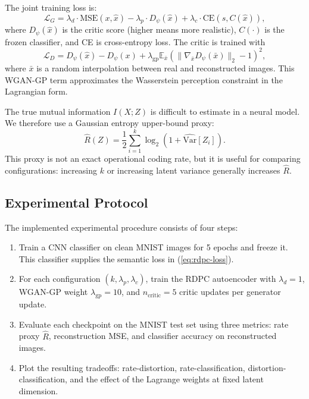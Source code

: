 \documentclass[conference]{IEEEtran}
\begin{document}
The joint training loss is:
\begin{equation}
\mathcal{L}_{G} = \lambda_d \cdot \text{MSE}(x, \hat{x})
 - \lambda_p \cdot D_\psi(\hat{x})
 + \lambda_c \cdot \text{CE}(s, C(\hat{x})),
\label{eq:rdpc-loss}
\end{equation}
where $D_\psi(\hat{x})$ is the critic score (higher means more realistic), $C(\cdot)$ is the frozen classifier, and CE is cross-entropy loss. The critic is trained with
\begin{equation}
\mathcal{L}_{D}=D_\psi(\hat{x})-D_\psi(x)
 +\lambda_{\mathrm{gp}}\mathbb{E}_{\bar{x}}
 \left(\|\nabla_{\bar{x}}D_\psi(\bar{x})\|_2-1\right)^2,
\end{equation}
where $\bar{x}$ is a random interpolation between real and reconstructed images. This WGAN-GP term approximates the Wasserstein perception constraint in the Lagrangian form.

The true mutual information $I(X;Z)$ is difficult to estimate in a neural model. We therefore use a Gaussian entropy upper-bound proxy:
\begin{equation}
\hat{R}(Z)=\frac{1}{2}\sum_{i=1}^{k}\log_2(1+\widehat{\mathrm{Var}}[Z_i]).
\label{eq:rate-proxy}
\end{equation}
This proxy is not an exact operational coding rate, but it is useful for comparing configurations: increasing $k$ or increasing latent variance generally increases $\hat{R}$.

\subsection{Experimental Protocol}

The implemented experimental procedure consists of four steps:
\begin{enumerate}
    \item Train a CNN classifier on clean MNIST images for 5 epochs and freeze it. This classifier supplies the semantic loss in (\ref{eq:rdpc-loss}).
    \item For each configuration $(k,\lambda_p,\lambda_c)$, train the RDPC autoencoder with $\lambda_d=1$, WGAN-GP weight $\lambda_{\mathrm{gp}}=10$, and $n_{\mathrm{critic}}=5$ critic updates per generator update.
    \item Evaluate each checkpoint on the MNIST test set using three metrics: rate proxy $\hat{R}$, reconstruction MSE, and classifier accuracy on reconstructed images.
    \item Plot the resulting tradeoffs: rate-distortion, rate-classification, distortion-classification, and the effect of the Lagrange weights at fixed latent dimension.
\end{enumerate}
\end{document}
